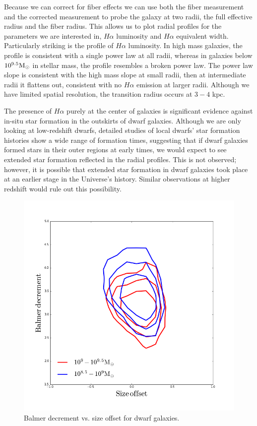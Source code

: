 \documentclass[iop]{emulateapj}
\begin{document}
Because we can correct for fiber effects we can use both the fiber measurement and the corrected measurement to probe the galaxy at two radii, the full effective radius and the fiber radius. This allows us to plot radial profiles for the parameters we are interested in, $H\alpha$ luminosity and $H\alpha$ equivalent width. Particularly striking is the profile of $H\alpha$ luminosity. In high mass galaxies, the profile is consistent with a single power law at all radii, whereas in galaxies below $10^{9.5} \rm M_{\odot}$ in stellar mass, the profile resembles a broken power law. The power law slope is consistent with the high mass slope at small radii, then at intermediate radii it flattens out, consistent with no $H\alpha$ emission at larger radii. Although we have limited spatial resolution, the transition radius occurs at $3-4$ kpc.

The presence of $H\alpha$ purely at the center of galaxies is significant evidence against in-situ star formation in the outskirts of dwarf galaxies. Although we are only looking at low-redshift dwarfs, detailed studies of local dwarfs' star formation histories show a wide range of formation times, suggesting that if dwarf galaxies formed stars in their outer regions at early times, we would expect to see extended star formation reflected in the radial profiles. This is not observed; however, it is possible that extended star formation in dwarf galaxies took place at an earlier stage in the Universe's history. Similar observations at higher redshift would rule out this possibility.

\begin{figure}
	\centering
	\includegraphics[width=1.5 \columnwidth]{BD_size.png}
	\caption{Balmer decrement vs. size offset for dwarf galaxies.}
     \label{fig:bdvsize}

\end{figure}
\end{document}
